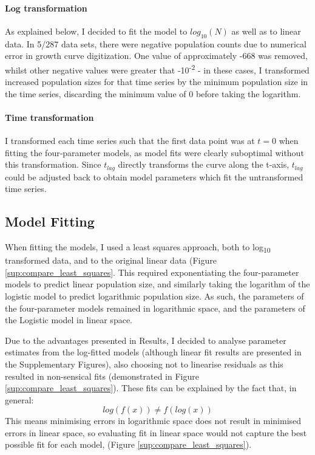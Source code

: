 \documentclass[11pt, a4paper]{article}
\begin{document}
\begin{linenumbers}
\paragraph{Log transformation}
As explained below, I decided to fit the model to $log_{10}(N)$ as well as to linear data. In 5/287 data sets, there were negative population counts due to numerical error in growth curve digitization. One value of approximately -668 was removed, whilst other negative values were greater that -10\textsuperscript{-2} - in these cases, I transformed increased population sizes for that time series by the minimum population size in the time series, discarding the minimum value of 0 before taking the logarithm.  

\paragraph{Time transformation}
I transformed each time series such that the first data point was at $t = 0$ when fitting the four-parameter models, as model fits were clearly suboptimal without this transformation. Since $t_{lag}$ directly transforms the curve along the t-axis, $t_{lag}$ could be adjusted back to obtain model parameters which fit the untransformed time series. 

\subsection{Model Fitting}
When fitting the models, I used a least squares approach, both to log\textsubscript{10} transformed data, and to the original linear data (Figure \ref{sup:compare_least_squares}. This required exponentiating the four-parameter models to predict linear population size, and similarly taking the logarithm of the logistic model to predict logarithmic population size. As such, the parameters of the four-parameter models remained in logarithmic space, and the parameters of the Logistic model in linear space. 

Due to the advantages presented in Results, I decided to analyse parameter estimates from the log-fitted models (although linear fit results are presented in the Supplementary Figures), also choosing not to linearise residuals as this resulted in non-sensical fits (demonstrated in Figure \ref{sup:compare_least_squares}). These fits can be explained by the fact that, in general:
\[log(f(x) ) \neq f(log(x))\]
This means minimising errors in logarithmic space does not result in minimised errors in linear space, so evaluating fit in linear space would not capture the best possible fit for each model, (Figure \ref{sup:compare_least_squares}).


\end{linenumbers}
\end{document}
